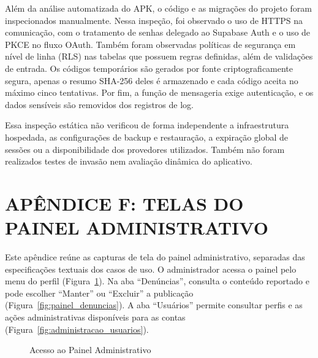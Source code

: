 Além da análise automatizada do APK, o código e as migrações do projeto foram inspecionados manualmente. Nessa inspeção, foi observado o uso de HTTPS na comunicação, com o tratamento de senhas delegado ao Supabase Auth e o uso de PKCE no fluxo OAuth. Também foram observadas políticas de segurança em nível de linha (RLS) nas tabelas que possuem regras definidas, além de validações de entrada. Os códigos temporários são gerados por fonte criptograficamente segura, apenas o resumo SHA-256 deles é armazenado e cada código aceita no máximo cinco tentativas. Por fim, a função de mensageria exige autenticação, e os dados sensíveis são removidos dos registros de log.

Essa inspeção estática não verificou de forma independente a infraestrutura hospedada, as configurações de backup e restauração, a expiração global de sessões ou a disponibilidade dos provedores utilizados. Também não foram realizados testes de invasão nem avaliação dinâmica do aplicativo.

\clearpage

\section*{APÊNDICE F: TELAS DO PAINEL ADMINISTRATIVO}
\label{apendice:painel-administrativo}

Este apêndice reúne as capturas de tela do painel administrativo, separadas das especificações textuais dos casos de uso. O administrador acessa o painel pelo menu do perfil (Figura~\ref{fig:acesso_administracao}). Na aba ``Denúncias'', consulta o conteúdo reportado e pode escolher ``Manter'' ou ``Excluir'' a publicação (Figura~\ref{fig:painel_denuncias}). A aba ``Usuários'' permite consultar perfis e as ações administrativas disponíveis para as contas (Figura~\ref{fig:administracao_usuarios}).

\renewcommand{\thefigure}{F\arabic{figure}}
\renewcommand{\theHfigure}{F\arabic{figure}}
\setcounter{figure}{0}

\begin{figure}[H]
    \centering
    \caption{Acesso ao Painel Administrativo}
    \label{fig:acesso_administracao}
\end{figure}

